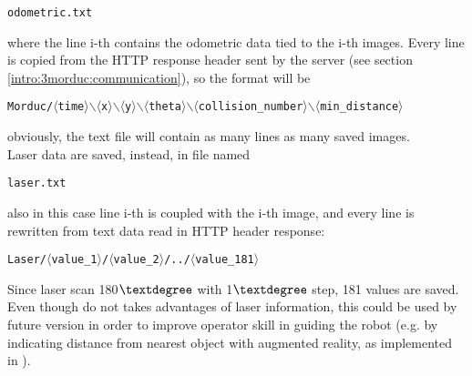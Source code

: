 \begin{center}
  \texttt{odometric.txt}
\end{center}

where the line i-th contains the odometric data tied to the i-th
images. Every line is copied from the HTTP response header sent
by the \morduc{} server (see section \ref{intro:3morduc:communication}),
so the format will be

\begin{center}
  \texttt{Morduc/$\langle$time$\rangle$$\backslash$$\langle$x$\rangle$$\backslash$$\langle$y$\rangle$$\backslash$$\langle$theta$\rangle$$\backslash$$\langle$collision\_number$\rangle$$\backslash$$\langle$min\_distance$\rangle$}
\end{center}

obviously, the text file will contain as many lines as many
saved images.
\\
Laser data are saved, instead, in file named

\begin{center}
  \texttt{laser.txt}
\end{center}

also in this case line i-th is coupled with the i-th image, and
every line is rewritten from text data read in HTTP header
response:

\begin{center}
  \texttt{Laser/$\langle$value\_1$\rangle$/$\langle$value\_2$\rangle$/../$\langle$value\_181$\rangle$}
\end{center}

Since laser scan 180$\textdegree$ with 1$\textdegree$ step,
181 values are saved.
\\
Even though \framework{} do not takes
advantages of laser information, this could be used by future
version in order to improve operator skill in guiding the robot
(e.g. by indicating distance from nearest object with augmented
reality, as implemented in \cite{morduc:macalusodetommaso}).
